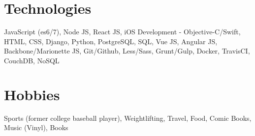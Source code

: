 \documentclass[]{friggeri-cv} %
\begin{document}
\section{Technologies}

JavaScript (es6/7), Node JS, React JS, iOS Development - Objective-C/Swift, HTML, CSS, Django, Python, PostgreSQL, SQL, Vue JS, Angular JS, Backbone/Marionette JS, Git/Github, Less/Sass, Grunt/Gulp, Docker, TravisCI, CouchDB, NoSQL

\section{Hobbies}

Sports (former college baseball player), Weightlifting, Travel, Food, Comic Books, Music (Vinyl), Books
\end{document}
